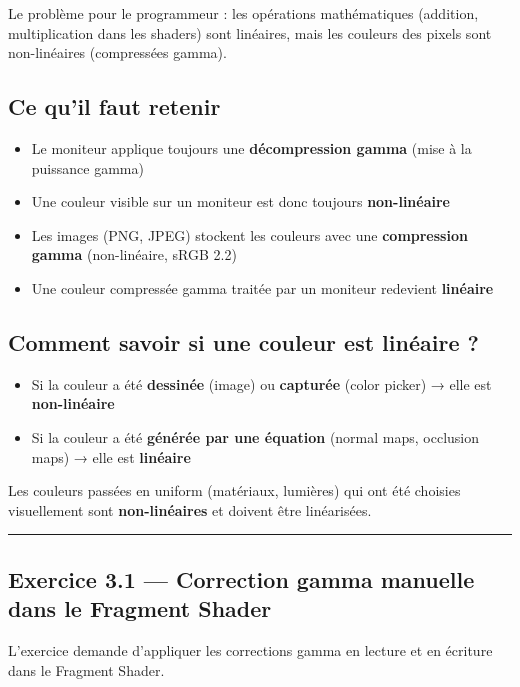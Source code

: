 \documentclass[11pt,a4paper]{article}
\begin{document}
Le problème pour le programmeur : les opérations mathématiques (addition, multiplication dans les shaders) sont linéaires, mais les couleurs des pixels sont non-linéaires (compressées gamma).

\subsection{Ce qu'il faut retenir}

\begin{itemize}
    \item Le moniteur applique toujours une \textbf{décompression gamma} (mise à la puissance gamma)
    \item Une couleur visible sur un moniteur est donc toujours \textbf{non-linéaire}
    \item Les images (PNG, JPEG) stockent les couleurs avec une \textbf{compression gamma} (non-linéaire, sRGB 2.2)
    \item Une couleur compressée gamma traitée par un moniteur redevient \textbf{linéaire}
\end{itemize}

\subsection{Comment savoir si une couleur est linéaire ?}

\begin{itemize}
    \item Si la couleur a été \textbf{dessinée} (image) ou \textbf{capturée} (color picker) → elle est \textbf{non-linéaire}
    \item Si la couleur a été \textbf{générée par une équation} (normal maps, occlusion maps) → elle est \textbf{linéaire}
\end{itemize}

Les couleurs passées en uniform (matériaux, lumières) qui ont été choisies visuellement sont \textbf{non-linéaires} et doivent être linéarisées.

\vspace{1em}\hrule\vspace{1em}

\subsection{Exercice 3.1 — Correction gamma manuelle dans le Fragment Shader}

L'exercice demande d'appliquer les corrections gamma en lecture et en écriture dans le Fragment Shader.
\end{document}
